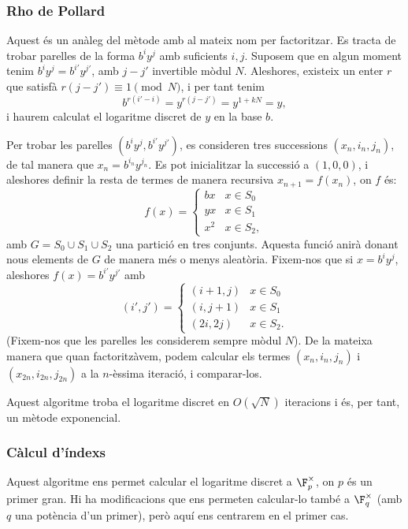   
  \subsubsection{Rho de Pollard}
  Aquest és un anàleg del mètode amb al mateix nom per factoritzar. Es tracta de trobar parelles de la forma $b^iy^j$ amb suficients $i,j$. Suposem que en algun moment tenim $b^iy^j=b^{i'}y^{j'}$, amb $j- j'$ invertible mòdul $N$. Aleshores, existeix un enter $r$ que satisfà $r(j-j')\equiv 1\pmod N$, i per tant tenim
  \[
  b^{r(i'-i)} = y^{r(j-j')} = y^{1+kN}=y,
  \]
  i haurem calculat el logaritme discret de $y$ en la base $b$.
  
  Per trobar les parelles $(b^iy^j,b^{i'}y^{j'})$, es consideren tres successions $(x_n,i_n,j_n)$, de tal manera que $x_n=b^{i_n} y^{j_n}$. Es pot inicialitzar la successió a $(1,0,0)$, i aleshores definir la resta de termes de manera recursiva $x_{n+1}=f(x_n)$, on $f$ és:
  \[
  f(x) = \begin{cases}
   bx & x\in S_0\\
   yx & x\in S_1\\
   x^2 & x\in S_2,
  \end{cases}
  \]
  amb $G=S_0\cup S_1\cup S_2$ una partició en tres conjunts.
  Aquesta funció anirà donant nous elements de $G$ de manera més o menys aleatòria. Fixem-nos que si $x=b^iy^j$, aleshores $f(x)=b^{i'}y^{j'}$ amb
  \[
  (i',j') = \begin{cases}
   (i+1,j) & x\in S_0\\
   (i,j+1) & x\in S_1\\
   (2i,2j) & x\in S_2.
  \end{cases}
  \]
  (Fixem-nos que les parelles les considerem sempre mòdul $N$). De la mateixa manera que quan factoritzàvem, podem calcular els termes $(x_n,i_n,j_n)$ i $(x_{2n},i_{2n},j_{2n})$ a la $n$-èssima iteració, i comparar-los.
  
  Aquest algoritme troba el logaritme discret en $O(\sqrt{N})$ iteracions i és, per tant, un mètode exponencial.
  
  \subsubsection{Càlcul d'índexs}
  Aquest algoritme ens permet calcular el logaritme discret a $\F_p^\times$, on $p$ és un primer gran. Hi ha modificacions que ens permeten calcular-lo també a $\F_q^\times$ (amb $q$ una potència d'un primer), però aquí ens centrarem en el primer cas.
  
